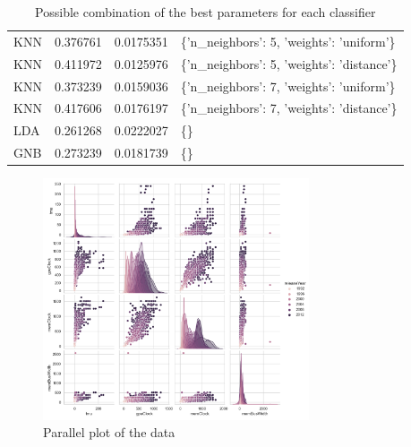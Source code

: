 \documentclass[conference,onecolumn]{IEEEtran}
\begin{document}
\begin{table}
\begin{center}
\begin{longtable}{lrrl}
             KNN          &   0.376761 &       0.0175351  & \{'n\_neighbors': 5, 'weights': 'uniform'\}                          \\
             KNN          &   0.411972 &       0.0125976  & \{'n\_neighbors': 5, 'weights': 'distance'\}                         \\
             KNN          &   0.373239 &       0.0159036  & \{'n\_neighbors': 7, 'weights': 'uniform'\}                          \\
             KNN          &   0.417606 &       0.0176197  & \{'n\_neighbors': 7, 'weights': 'distance'\}                         \\
             LDA          &   0.261268 &       0.0222027  & \{\}                                                                \\
             GNB          &   0.273239 &       0.0181739  & \{\}                                                                \\
            \hline
        \end{longtable}
        \caption{Possible combination of the best parameters for each classifier}
        \label{appdx:bestParameters}
        \end{center}
    \end{table}

    \begin{figure}
        \centering
        \includegraphics[width=0.7\textwidth]{Plots/DataPariPlot.png}
        \caption{Parallel plot of the data}
        \label{appdx:parallelPlotOfTheData}
    \end{figure}
\end{document}
